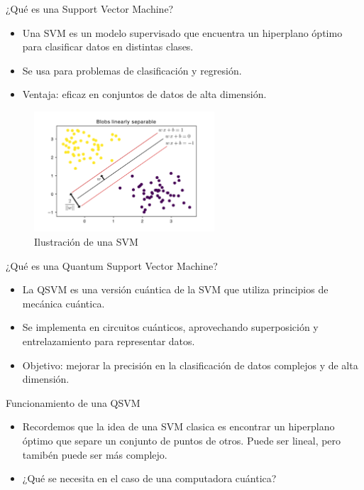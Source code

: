 \documentclass{beamer}
\begin{document}
\begin{frame}{¿Qué es una Support Vector Machine?}
    \begin{itemize}
        \item Una SVM es un modelo supervisado que encuentra un hiperplano óptimo para clasificar datos en distintas clases.
        \item Se usa para problemas de clasificación y regresión.
        \item Ventaja: eficaz en conjuntos de datos de alta dimensión.
    \end{itemize}
    \begin{figure}
        \includegraphics[width=0.6\textwidth]{../images/presentation/linear_svm_hardcore.png}
        \caption{Ilustración de una SVM}
    \end{figure}
\end{frame}

\begin{frame}{¿Qué es una Quantum Support Vector Machine?}
    \begin{itemize}
        \item La QSVM es una versión cuántica de la SVM que utiliza principios de mecánica cuántica.
        \item Se implementa en circuitos cuánticos, aprovechando superposición y entrelazamiento para representar datos.
        \item Objetivo: mejorar la precisión en la clasificación de datos complejos y de alta dimensión.
    \end{itemize}
\end{frame}

\begin{frame}{Funcionamiento de una QSVM}
    \begin{itemize}
        \item Recordemos que la idea de una SVM clasica es encontrar un hiperplano óptimo que separe un conjunto de puntos
        de otros. Puede ser lineal, pero tamibén puede ser más complejo.
        \item ¿Qué se necesita en el caso de una computadora cuántica?
        
    \end{itemize}
\end{frame}
\end{document}
